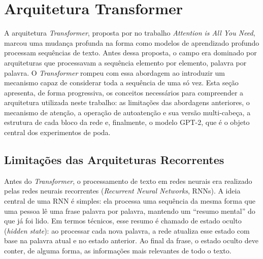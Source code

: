
\section{Arquitetura Transformer}\label{sec:transformer}

A arquitetura \textit{Transformer}, proposta por  no trabalho
\textit{Attention is All You Need}, marcou uma mudança profunda na forma como modelos
de aprendizado profundo processam sequências de texto. Antes dessa proposta, o campo
era dominado por arquiteturas que processavam a sequência elemento por elemento, palavra
por palavra. O \textit{Transformer} rompeu com essa abordagem ao introduzir um mecanismo
capaz de considerar toda a sequência de uma só vez. Esta seção apresenta, de forma
progressiva, os conceitos necessários para compreender a arquitetura utilizada neste
trabalho: as limitações das abordagens anteriores, o mecanismo de atenção, a operação
de autoatenção e sua versão multi-cabeça, a estrutura de cada bloco da rede e,
finalmente, o modelo GPT-2, que é o objeto central dos experimentos de poda.


\subsection{Limitações das Arquiteturas Recorrentes}\label{subsec:limitacoes_rnn}

Antes do \textit{Transformer}, o processamento de texto em redes neurais era realizado
pelas redes neurais recorrentes (\textit{Recurrent Neural Networks}, RNNs). A ideia
central de uma RNN é simples: ela processa uma sequência da mesma forma que uma pessoa
lê uma frase palavra por palavra, mantendo um ``resumo mental'' do que já foi lido. Em
termos técnicos, esse resumo é chamado de estado oculto (\textit{hidden state}): ao
processar cada nova palavra, a rede atualiza esse estado com base na palavra atual e no
estado anterior. Ao final da frase, o estado oculto deve conter, de alguma forma, as
informações mais relevantes de todo o texto.

